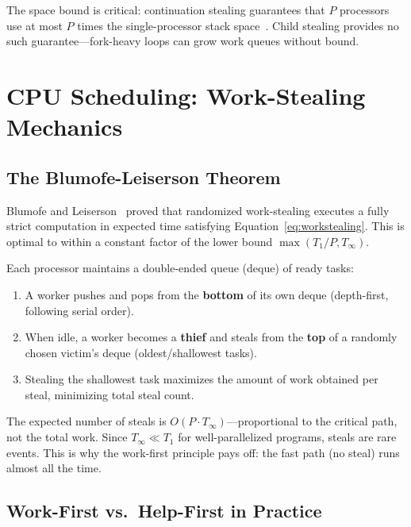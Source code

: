 \documentclass[11pt,letterpaper]{article}
\begin{document}
The space bound is critical: continuation stealing guarantees that $P$ processors use at most $P$ times the single-processor stack space~\cite{blumofe1999workstealing}. Child stealing provides no such guarantee---fork-heavy loops can grow work queues without bound.

\section{CPU Scheduling: Work-Stealing Mechanics}
\label{sec:cpu}

\subsection{The Blumofe-Leiserson Theorem}

Blumofe and Leiserson~\cite{blumofe1999workstealing} proved that randomized work-stealing executes a fully strict computation in expected time satisfying Equation~\ref{eq:workstealing}. This is optimal to within a constant factor of the lower bound $\max(T_1/P, T_\infty)$.

Each processor maintains a double-ended queue (deque) of ready tasks:

\begin{enumerate}
    \item A worker pushes and pops from the \textbf{bottom} of its own deque (depth-first, following serial order).
    \item When idle, a worker becomes a \textbf{thief} and steals from the \textbf{top} of a randomly chosen victim's deque (oldest/shallowest tasks).
    \item Stealing the shallowest task maximizes the amount of work obtained per steal, minimizing total steal count.
\end{enumerate}

The expected number of steals is $O(P \cdot T_\infty)$---proportional to the critical path, not the total work. Since $T_\infty \ll T_1$ for well-parallelized programs, steals are rare events. This is why the work-first principle pays off: the fast path (no steal) runs almost all the time.

\subsection{Work-First vs.\ Help-First in Practice}
\end{document}
